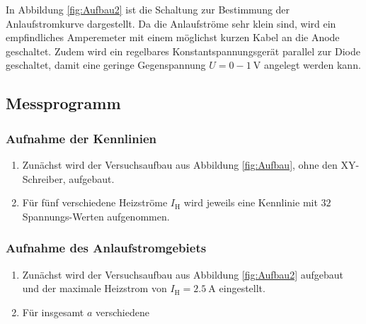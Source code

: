 \FloatBarrier

In Abbildung \ref{fig:Aufbau2} ist die Schaltung zur Bestimmung der
Anlaufstromkurve dargestellt. Da die Anlaufströme sehr klein sind, wird ein
empfindliches Amperemeter mit einem möglichst kurzen Kabel an die Anode
geschaltet. Zudem wird ein regelbares Konstantspannungsgerät parallel
zur Diode geschaltet, damit eine geringe Gegenspannung $U = 0-\SI{1}{\volt}$
angelegt werden kann.

\subsection{Messprogramm}

\subsubsection{Aufnahme der Kennlinien}

\begin{enumerate}

\item Zunächst wird der Versuchsaufbau aus Abbildung \ref{fig:Aufbau}, ohne den
XY-Schreiber, aufgebaut.

\item Für fünf verschiedene Heizströme $I_\text{H}$ wird jeweils eine
Kennlinie mit $32$ Spannungs-Werten aufgenommen.

\end{enumerate}

\subsubsection{Aufnahme des Anlaufstromgebiets}

\begin{enumerate}

\item Zunächst wird der Versuchsaufbau aus Abbildung \ref{fig:Aufbau2} aufgebaut
und der maximale Heizstrom von $I_\text{H} = \SI{2.5}{\ampere}$ eingestellt.

\item Für insgesamt $a$ verschiedene

\end{enumerate}
